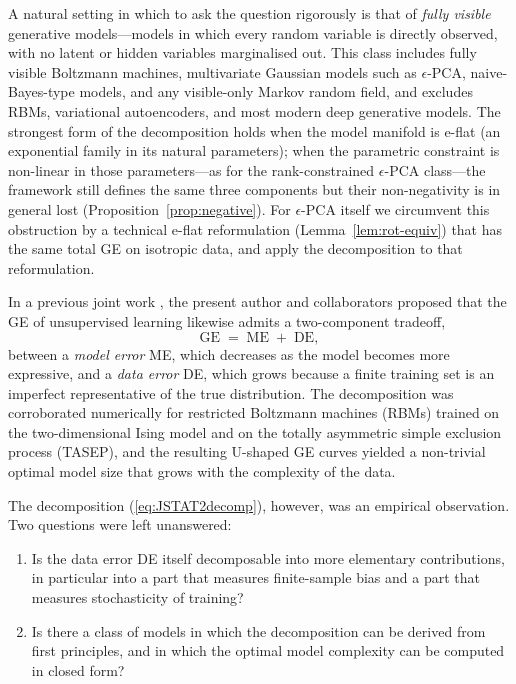 \documentclass[11pt,a4paper]{article}
\theoremstyle{definition}
\theoremstyle{remark}
\begin{document}
A natural setting in which to ask the question rigorously is
that of \emph{fully visible} generative models---models in
which every random variable is directly observed, with no
latent or hidden variables marginalised out. This class
includes fully visible Boltzmann machines, multivariate
Gaussian models such as $\epsilon$-PCA, naive-Bayes-type
models, and any visible-only Markov random field, and excludes
RBMs, variational autoencoders, and most modern deep generative
models. The strongest form of the decomposition holds when the
model manifold is e-flat (an exponential family in its natural
parameters); when the parametric constraint is non-linear in
those parameters---as for the rank-constrained $\epsilon$-PCA
class---the framework still defines the same three components
but their non-negativity is in general lost
(Proposition~\ref{prop:negative}). For $\epsilon$-PCA itself we
circumvent this obstruction by a technical e-flat
reformulation (Lemma~\ref{lem:rot-equiv}) that has the same
total GE on isotropic data, and apply the decomposition to that
reformulation.

In a previous joint work \cite{Kim2023JSTAT}, the present author and
collaborators proposed that the GE of unsupervised learning likewise
admits a two-component tradeoff,
\begin{equation}
  \mathrm{GE} \;=\; \mathrm{ME} \;+\; \mathrm{DE},
  \label{eq:JSTAT2decomp}
\end{equation}
between a \emph{model error} ME, which decreases as the model becomes
more expressive, and a \emph{data error} DE, which grows because a
finite training set is an imperfect representative of the true
distribution.
The decomposition was corroborated numerically for restricted
Boltzmann machines (RBMs) trained on the two-dimensional Ising model
and on the totally asymmetric simple exclusion process (TASEP), and
the resulting U-shaped GE curves yielded a non-trivial optimal model
size that grows with the complexity of the data.

The decomposition (\ref{eq:JSTAT2decomp}), however, was an empirical
observation. Two questions were left unanswered:
\begin{enumerate}
\item[(Q1)] Is the data error DE itself decomposable into more
            elementary contributions, in particular into a part that
            measures finite-sample bias and a part that measures
            stochasticity of training?
\item[(Q2)] Is there a class of models in which the decomposition can
            be derived from first principles, and in which the optimal
            model complexity can be computed in closed form?
\end{enumerate}
\end{document}
